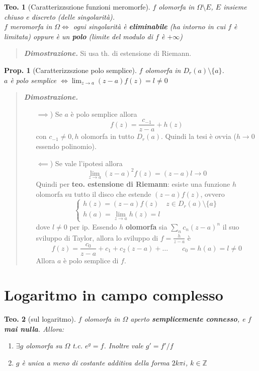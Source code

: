 \documentclass[a4paper,10pt]{article}
\theoremstyle{indentdefinition}
\theoremstyle{indenttheorem}
\newtheorem{thm}{Teo.}
\newtheorem{prop}{Prop.}
\theoremstyle{myremark}
\theoremstyle{indentgeneral}
\newenvironment{dimo}{\begin{quote}\textit{\textbf{Dimostrazione.}}}{\end{quote}} %
\begin{document}
\begin{thm}[Caratterizzszione funzioni meromorfe]
     $f$ olomorfa in $\Omega\setminus E$, $E$ insieme chiuso e discreto (delle singolarità). \\
     $f$ meromorfa in $\Omega \iff$ ogni singolarità è \textbf{eliminabile} (ha intorno in cui $f$ è limitata) oppure è un \textbf{polo} (limite del modulo di $f$ è $+\infty$)
\end{thm}
\begin{dimo}
    Si usa th. di estensione di Riemann.
\end{dimo}

\begin{prop}[Caratterizzszione polo semplice]
     $f$ olomorfa in $D_r(a)\setminus\{a\}$. \\
     $a$ è polo semplice $\iff \lim_{z\to a}(z-a)f(z)=l\ne0$
\end{prop}
\begin{dimo}
    \begin{itemize}
        \item[$\implies$)] Se $a$ è polo semplice allora
        $$f(z)=\frac{c_{-1}}{z-a}+h(z)$$
        con $c_{-1}\ne0,h$ olomorfa in tutto $D_r(a)$. Quindi la tesi è ovvia ($h\to 0$ essendo polinomio).
         \item[$\impliedby$)] Se vale l'ipotesi allora
         $$\lim_{z\to a}(z-a)^2f(z)=(z-a)l\to0$$
         Quindi per \textbf{teo. estensione di Riemann}: esiste una funzione $h$ olomorfa su tutto il disco che estende $(z-a)f(z)$, ovvero
       $$  \begin{cases}
             h(z)=(z-a)f(z) \quad z\in D_r(a)\setminus\{a\} \\
             h(a)=\lim_{z\to a}h(z)=l
         \end{cases}$$
         dove $l\ne0$ per ip. Essendo $h$ \textbf{olomorfa} sia $\sum_nc_n(z-a)^n$ il suo sviluppo di Taylor, allora lo sviluppo di $f=\frac{h}{z-a}$ è 
         $$f(z)=\frac{c_0}{z-a}+c_1+c_2(z-a)+\dots \quad \quad c_0=h(a)=l\ne0$$
         Allora $a$ è polo semplice di $f$.
    \end{itemize}
\end{dimo}

\section{Logaritmo in campo complesso}
\begin{thm}[sul logaritmo]
$f$ olomorfa in $\Omega$ aperto \textbf{semplicemente connesso}, e $f$ \textbf{mai nulla}. Allora:
\begin{enumerate}
    \item $ \exists g$ olomorfa su $\Omega$ t.c. $e^g=f$. Inoltre vale $g'=f'/f$
    \item $g$ è unica a meno di costante additiva della forma $2k\pi i$, $k\in\mathbb{Z}$
   
\end{enumerate} 
\end{thm}
\end{document}
